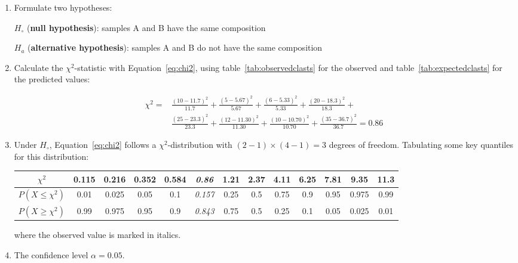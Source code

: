 \begin{enumerate}
\item  Formulate two hypotheses:

  $H_\circ$ (\textbf{null hypothesis}): samples A and B have the same composition

  $H_a$ (\textbf{alternative hypothesis}):
  samples A and B do not have the same composition
  
\item Calculate the $\chi^2$-statistic with Equation~\ref{eq:chi2},
  using table~\ref{tab:observedclasts} for the observed and
  table~\ref{tab:expectedclasts} for the predicted values:
  
  \begin{equation}
    \begin{split}
      \chi^2 = &
      \frac{(10-11.7)^2}{11.7} + \frac{(5-5.67)^2}{5.67} +
      \frac{(6-5.33)^2}{5.33} + \frac{(20-18.3)^2}{18.3} + \\
      & \frac{(25-23.3)^2}{23.3} + \frac{(12-11.30)^2}{11.30} +
      \frac{(10-10.70)^2}{10.70} + \frac{(35-36.7)^2}{36.7} = 0.86
    \end{split}
  \end{equation}

\item Under $H_\circ$, Equation~\ref{eq:chi2} follows a
  $\chi^2$-distribution with $(2-1)\times(4-1)=3$ degrees of
  freedom. Tabulating some key quantiles for this distribution:

  \begin{center}
    \begin{tabular}{c|c@{\gap}c@{\gap}c@{\gap}c@{\gap}
        c@{\gap}c@{\gap}c@{\gap}c@{\gap}c@{\gap}c@{\gap}c@{\gap}c}
      $\chi^2$ & 0.115 & 0.216 & 0.352 & 0.584 & \textit{0.86} &
      1.21 & 2.37 & 4.11 & 6.25 & 7.81 & 9.35 & 11.3 \\ \hline
      $P(X\leq{\chi^2})$ & 0.01 & 0.025 & 0.05 & 0.1 & \textit{0.157} &
      0.25 & 0.5 & 0.75 & 0.9 & 0.95 & 0.975 & 0.99 \\
      $P(X\geq{\chi^2})$ & 0.99 & 0.975 & 0.95 & 0.9 & \textit{0.843} & 
      0.75 & 0.5 & 0.25 & 0.1 & 0.05 & 0.025 & 0.01
    \end{tabular}
  \end{center}

  \noindent where the observed value is marked in italics.
  
\item The confidence level $\alpha = 0.05$.


\end{enumerate}
